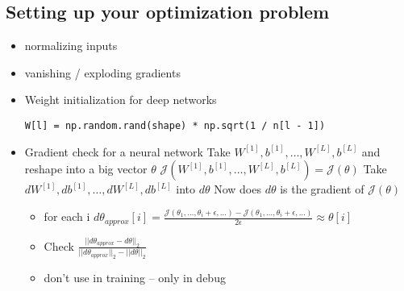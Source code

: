 \documentclass[11pt]{article}
\begin{document}
\subsection{Setting up your optimization problem}
\label{sec-4-4}
\begin{itemize}
\item normalizing inputs
\item vanishing / exploding gradients
\item Weight initialization for deep networks
\begin{verbatim}
W[l] = np.random.rand(shape) * np.sqrt(1 / n[l - 1])
\end{verbatim}
\item Gradient check for a neural network
Take $W^{[1]}, b^{[1]},\dots,W^{[L]},b^{[L]}$ and reshape into a big vector $\theta$
$\mathcal{J}(W^{[1]}, b^{[1]},\dots,W^{[L]},b^{[L]})=\mathcal{J}(\theta)$
Take $dW^{[1]}, db^{[1]},\dots,dW^{[L]},db^{[L]}$ into $d\theta$
Now does $d\theta$ is the gradient of $\mathcal{J}(\theta)$
\begin{itemize}
\item for each i
$d\theta_{approx}[i]=\frac{\mathcal{J}(\theta_1,\dots,\theta_i+\epsilon,\dots)-
       \mathcal{J}(\theta_1,\dots,\theta_i+\epsilon,\dots)}{2\epsilon}\approx\theta[i]$
\item Check
$\frac{||d\theta_{approx}-d\theta||_2}{||d\theta_{approx}||_2-||d\theta||_2}$
\item don't use in training -- only in debug
\end{itemize}
\end{itemize}
\end{document}
